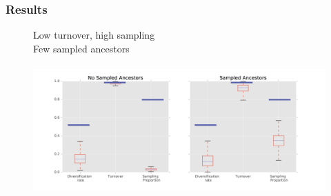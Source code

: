 \documentclass[]{beamer}
\begin{document}
\begin{frame}
\frametitle{Results}
\begin{center}
\begin{figure}
Low turnover, high sampling  \\
Few sampled ancestors \\
\lambda   \mu   \psi   \rho \\
\includegraphics[scale=0.4]{images/HighTurnHighSamplog.png}
\end{figure}
\end{center}
\end{frame}
\end{document}
